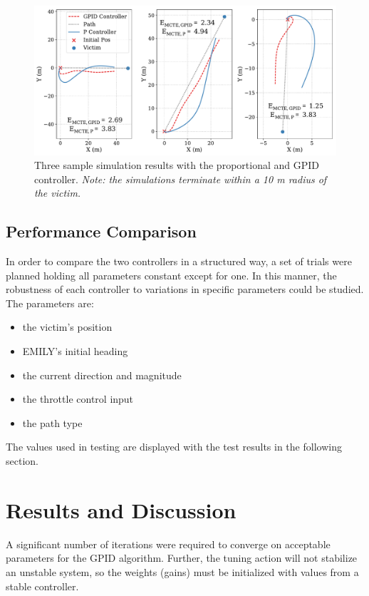 \documentclass[conference]{IEEEtran}
\begin{document}
\label{sec:results_and_discussion}
\begin{figure}[h!]
  \centering
  \includegraphics[scale=0.5]{figs/sample_trials.pdf}
  \caption{Three sample simulation results with the proportional and GPID controller. \textit{Note: the simulations terminate within a 10 m radius of the victim.}}
  \label{fig:sample}
\end{figure}

\subsection{Performance Comparison}
In order to compare the two controllers in a structured way, a set of trials were planned holding all parameters constant except for one. In this manner, the robustness of each controller to variations in specific parameters could be studied. The parameters are:
\begin{itemize}
  \item the victim's position
  \item EMILY's initial heading
  \item the current direction and magnitude
  \item the throttle control input
  \item the path type
\end{itemize}
The values used in testing are displayed with the test results in the following section.

\section{Results and Discussion} %


A significant number of iterations were required to converge on acceptable parameters for the GPID algorithm. Further, the tuning action will not stabilize an unstable system, so the weights (gains) must be initialized with values from a stable controller.
\end{document}

